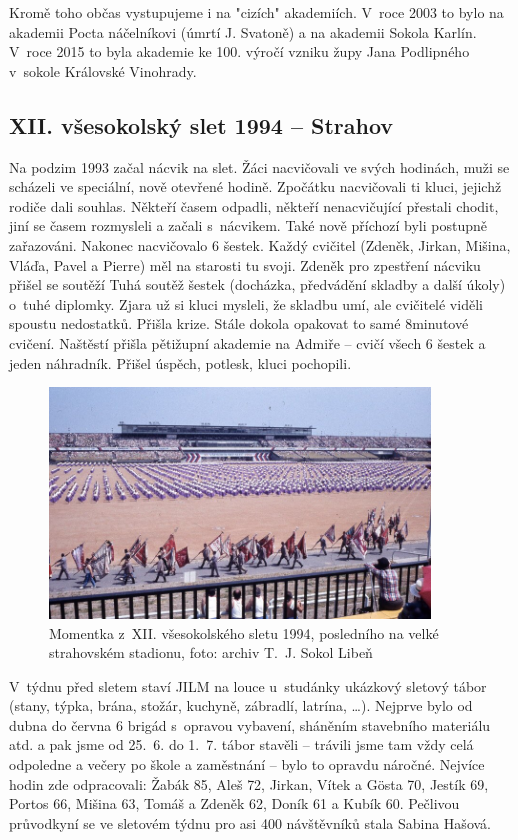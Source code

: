 \documentclass[a5paper, 11pt, twoside]{article}
\begin{document}
Kromě toho občas vystupujeme i na "cizích" akademiích. V~roce 2003 to
bylo na akademii Pocta náčelníkovi (úmrtí J. Svatoně) a na akademii
Sokola Karlín. V~roce 2015 to byla akademie ke 100. výročí vzniku župy
Jana Podlipného v~sokole Královské Vinohrady.

\subsection{XII. všesokolský slet 1994 --
Strahov}

Na podzim 1993 začal nácvik na slet. Žáci nacvičovali ve svých hodinách,
muži se scházeli ve speciální, nově otevřené hodině. Zpočátku
nacvičovali ti kluci, jejichž rodiče dali souhlas. Někteří časem
odpadli, někteří nenacvičující přestali chodit, jiní se časem rozmysleli
a začali s~nácvikem. Také nově příchozí byli postupně zařazováni.
Nakonec nacvičovalo 6 šestek. Každý cvičitel (Zdeněk, Jirkan, Mišina,
Vláďa, Pavel a Pierre) měl na starosti tu svoji. Zdeněk pro zpestření
nácviku přišel se soutěží Tuhá soutěž šestek (docházka, předvádění
skladby a další úkoly) o~tuhé diplomky. Zjara už si kluci mysleli, že
skladbu umí, ale cvičitelé viděli spoustu nedostatků. Přišla krize.
Stále dokola opakovat to samé 8minutové cvičení. Naštěstí přišla
pětižupní akademie na Admiře -- cvičí všech 6 šestek a jeden náhradník.
Přišel úspěch, potlesk, kluci pochopili.

\begin{figure}[h!]
  \centering 
  \includegraphics[width=0.9\textwidth]{img/44_slet_strahov.jpg}
  \caption*{Momentka z~XII. všesokolského sletu 1994, posledního na velké
  strahovském stadionu, foto: archiv T.~J. Sokol Libeň}
\end{figure}

V~týdnu před sletem staví JILM na louce u~studánky ukázkový sletový
tábor (stany, týpka, brána, stožár, kuchyně, zábradlí, latrína, \ldots{}).
Nejprve bylo od dubna do června 6 brigád s~opravou vybavení, sháněním
stavebního materiálu atd. a pak jsme od 25.~6. do 1.~7. tábor stavěli --
trávili jsme tam vždy celá odpoledne a večery po škole a zaměstnání --
bylo to opravdu náročné. Nejvíce hodin zde odpracovali: Žabák 85, Aleš
72, Jirkan, Vítek a Gösta 70, Jestík 69, Portos 66, Mišina 63, Tomáš a
Zdeněk 62, Doník 61 a Kubík 60. Pečlivou průvodkyní se ve sletovém týdnu
pro asi 400 návštěvníků stala Sabina Hašová.
\end{document}

